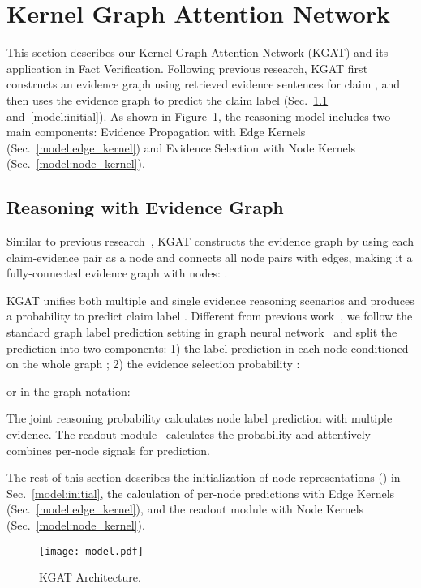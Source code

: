 \documentclass[11pt,a4paper]{article}
\begin{document}
\section{Kernel Graph Attention Network}
This section describes our Kernel Graph Attention Network (KGAT) and its application in Fact Verification. 
Following previous research, KGAT first constructs an evidence graph using retrieved evidence sentences  for claim , and then uses the evidence graph to predict the claim label  (Sec.~\ref{sec:graph} and~\ref{model:initial}). As shown in Figure~\ref{fig:model}, the reasoning model includes two main components: Evidence Propagation with Edge Kernels (Sec.~\ref{model:edge_kernel}) and Evidence Selection with Node Kernels (Sec.~\ref{model:node_kernel}).


\subsection{Reasoning with Evidence Graph}\label{sec:graph}
Similar to previous research~\citep{zhou2019gear},
KGAT constructs the evidence graph  by using each claim-evidence pair as a node and connects all node pairs with edges, making it a fully-connected evidence graph with  nodes: .

KGAT unifies both multiple and single evidence reasoning scenarios and produces a probability  to predict claim label . Different from previous work~\cite{zhou2019gear}, we follow the standard graph label prediction setting in graph neural network~\cite{velivckovic2017graph} and split the prediction into two components: 1) the label prediction in each node conditioned on the whole graph ; 2) the evidence selection probability :

or in the graph notation:

The joint reasoning probability  calculates node label prediction with multiple evidence. 
The readout module~\cite{knyazev2019understanding} calculates the probability  and attentively combines per-node signals for prediction. 

The rest of this section describes the initialization of node representations () in Sec.~\ref{model:initial}, the calculation of per-node predictions  with Edge Kernels (Sec.~\ref{model:edge_kernel}), and the readout module  with Node Kernels (Sec.~\ref{model:node_kernel}).


\begin{figure}[t]
	\centering
	\texttt{[image: model.pdf]}
	\caption{KGAT Architecture.}
	\label{fig:model}
\end{figure}
\end{document}
